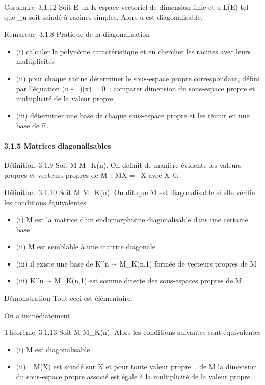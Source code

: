 \documentclass[]{article}
\begin{document}
Corollaire~3.1.12 Soit E un K-espace vectoriel de dimension finie et u \in
L(E) tel que \chi_u soit scindé à racines simples. Alors u est
diagonalisable.

Remarque~3.1.8 Pratique de la diagonalisation

\begin{itemize}
\itemsep1pt\parskip0pt
\item
  (i) calculer le polynôme caractéristique et en chercher les racines
  avec leurs multiplicités
\item
  (ii) pour chaque racine déterminer le sous-espace propre
  correspondant, défini par l'équation (u -
  \lambda~\mathrmId)(x) = 0~; comparer dimension du
  sous-espace propre et multiplicité de la valeur propre
\item
  (iii) déterminer une base de chaque sous-espace propre et les réunir
  en une base de E.
\end{itemize}

\paragraph{3.1.5 Matrices diagonalisables}

Définition~3.1.9 Soit M \in M_K(n). On définit de manière
évidente les valeurs propres et vecteurs propres de M~: MX = \lambda~X avec
X\neq~0.

Définition~3.1.10 Soit M \in M_K(n). On dit que M est
diagonalisable si elle vérifie les conditions équivalentes

\begin{itemize}
\itemsep1pt\parskip0pt
\item
  (i) M est la matrice d'un endomorphisme diagonalisable dans une
  certaine base
\item
  (ii) M est semblable à une matrice diagonale
\item
  (iii) il existe une base de K^n ∼ M_K(n,1) formée
  de vecteurs propres de M
\item
  (iii) K^n ∼ M_K(n,1) est somme directe des
  sous-espaces propres de M
\end{itemize}

Démonstration Tout ceci est élémentaire.

On a immédiatement

Théorème~3.1.13 Soit M \in M_K(n). Alors les conditions suivantes
sont équivalentes

\begin{itemize}
\itemsep1pt\parskip0pt
\item
  (i) M est diagonalisable
\item
  (ii) \chi_M(X) est scindé sur K et pour toute valeur propre \lambda~ de
  M la dimension du sous-espace propre associé est égale à la
  multiplicité de la valeur propre.
\end{itemize}
\end{document}
